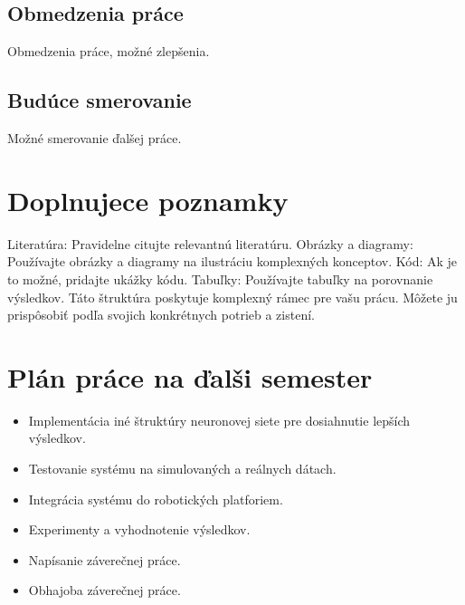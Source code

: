 \subsection{Obmedzenia práce}Obmedzenia práce, možné zlepšenia.
\subsection{Budúce smerovanie}Možné smerovanie ďalšej práce.

\section{Doplnujece poznamky }
Literatúra: Pravidelne citujte relevantnú literatúru.
Obrázky a diagramy: Používajte obrázky a diagramy na ilustráciu komplexných konceptov.
Kód: Ak je to možné, pridajte ukážky kódu.
Tabuľky: Používajte tabuľky na porovnanie výsledkov.
Táto štruktúra poskytuje komplexný rámec pre vašu prácu. Môžete ju prispôsobiť podľa svojich konkrétnych potrieb a zistení.
\section{Plán práce na ďalši semester}
\begin{itemize}
    \item Implementácia iné štruktúry neuronovej siete pre dosiahnutie lepších výsledkov.
    \item Testovanie systému na simulovaných a reálnych dátach.
    \item Integrácia systému do robotických platforiem.
    \item Experimenty a vyhodnotenie výsledkov.
    \item Napísanie záverečnej práce.
    \item Obhajoba záverečnej práce.
\end{itemize}